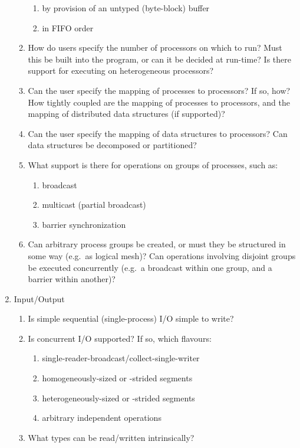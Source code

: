 \begin{enumerate}
\begin{enumerate}
\begin{enumerate}
    \item by provision of an untyped (byte-block) buffer
    \item in FIFO order
    \end{enumerate}
  \item How do users specify the number of processors on which to run?
	Must this be built into the program,
	or can it be decided at run-time?
	Is there support for executing on heterogeneous processors?
  \item Can the user specify the mapping of processes to processors?
	If so, how?
	How tightly coupled are the mapping of processes to processors,
	and the mapping of distributed data structures (if supported)?
  \item Can the user specify the mapping of data structures to processors?
        Can data structures be decomposed or partitioned?
  \item What support is there for operations on groups of processes, such as:
    \begin{enumerate}
    \item broadcast
    \item multicast (partial broadcast)
    \item barrier synchronization
    \end{enumerate}
  \item Can arbitrary process groups be created,
	or must they be structured in some way
	(e.g.\ as logical mesh)?
	Can operations involving disjoint groups be executed concurrently
	(e.g.\ a broadcast within one group,
	and a barrier within another)?
  \end{enumerate}
\item Input/Output
  \begin{enumerate}
  \item Is simple sequential (single-process) I/O simple to write?
  \item Is concurrent I/O supported?  If so, which flavours:
    \begin{enumerate}
    \item single-reader-broadcast/collect-single-writer
    \item homogeneously-sized or -strided segments
    \item heterogeneously-sized or -strided segments
    \item arbitrary independent operations
    \end{enumerate}
  \item What types can be read/written intrinsically?

\end{enumerate}
\end{enumerate}
